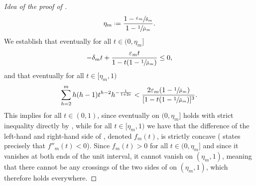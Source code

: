 \documentclass[11pt, a4paper, twoside]{article}
\newcommand*{\defeq}{\mathrel{\vcenter{\baselineskip0.5ex \lineskiplimit0pt
			\hbox{\scriptsize.}\hbox{\scriptsize.}}}=}
\newcommand{\eps}{\varepsilon}
\numberwithin{equation}{section}
\begin{document}
\begin{proof}[Idea of the proof of ]
\begin{align*}
			\eta_m\defeq \frac{1-\sfrac{\eps_m}{\delta_m}}{1-\sfrac{1}{\tilde{\mu}_m}}.
		\end{align*}
		We establish that eventually for all $t\in(0,\eta_m]$
		\begin{equation}\label{linear1main}
			-\delta_mt+\frac{\eps_mt}{1-t(1-\sfrac{1}{\tilde{\mu}_m})}\le0,
		\end{equation}
		and that eventually for all $t\in[\eta_m,1)$
		\begin{equation}\label{concave1main}
			\sum_{h=2}^m h(h-1)t^{h-2} h^{-\frac{1}{1+2\eps}}<\frac{2\eps_m(1-\sfrac{1}{\tilde{\mu}_m})}{[1-t(1-\sfrac{1}{\tilde{\mu}_m})]^3}.
		\end{equation}
		This implies  for all $t\in (0,1)$, since eventually on $(0,\eta_m]$  holds with strict inequality directly by , while for all $t\in[\eta_m,1)$ we have that the difference of the left-hand and right-hand side of , denoted $f_m(t)$, is strictly concave ( states precisely that $f''_m(t)<0$). Since $f_m(t)>0$ for all $t\in(0,\eta_m]$ and since it vanishes at both ends of the unit interval, it cannot vanish on $(\eta_m,1)$, meaning that there cannot be any crossings of the two sides of  on $(\eta_m,1)$, which therefore holds everywhere. 
		

\end{proof}
\end{document}
